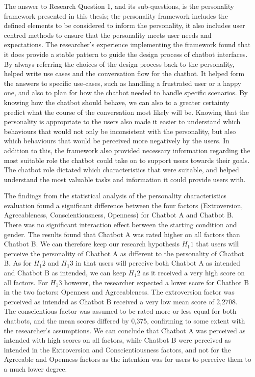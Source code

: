 The answer to Research Question 1, and its sub-questions, is the personality framework presented in this thesis; the personality framework includes the defined elements to be considered to inform the personality, it also includes user centred methods to ensure that the personality meets user needs and expectations. The researcher's experience implementing the framework found that it does provide a stable pattern to guide the design process of chatbot interfaces. By always referring the choices of the design process back to the personality, helped write use cases and the conversation flow for the chatbot. It helped form the answers to specific use-cases, such as handling a frustrated user or a happy one, and also to plan for how the chatbot needed to handle specific scenarios. By knowing how the chatbot should behave, we can also to a greater certainty predict what the course of the conversation most likely will be. Knowing that the personality is appropriate to the users also made it easier to understand which behaviours that would not only be inconsistent with the personality, but also which behaviours that would be perceived more negatively by the users. In addition to this, the framework also provided necessary information regarding the most suitable role the chatbot could take on to support users towards their goals. The chatbot role dictated which characteristics that were suitable, and helped understand the most valuable tasks and information it could provide users with.

The findings from the statistical analysis of the personality characteristics evaluation found a significant difference between the four factors (Extroversion, Agreeableness, Conscientiousness, Openness) for Chatbot A and Chatbot B. There was no significant interaction effect between the starting condition and gender. The results found that Chatbot A was rated higher on all factors than Chatbot B. We can therefore keep our research hypothesis $H_1 1$ that users will perceive the personality of Chatbot A as different to the personality of Chatbot B. As for $H_1 2$ and $H_1 3$ in that users will perceive both Chatbot A as intended and Chatbot B as intended, we can keep $H_1 2$ as it received a very high score on all factors. For $H_1 3$ however, the researcher expected a lower score for Chatbot B in the two factors: Openness and Agreeableness. The extroversion factor was perceived as intended as Chatbot B received a very low mean score of 2,2708. The conscientious factor was assumed to be rated more or less equal for both chatbots, and the mean scores differed by 0,375, confirming to some extent with the researcher's assumptions. We can conclude that Chatbot A was perceived as intended with high scores on all factors, while Chatbot B were perceived as intended in the Extroversion and Conscientiousness factors, and not for the Agreeable and Openness factors as the intention was for users to perceive them to a much lower degree. 

